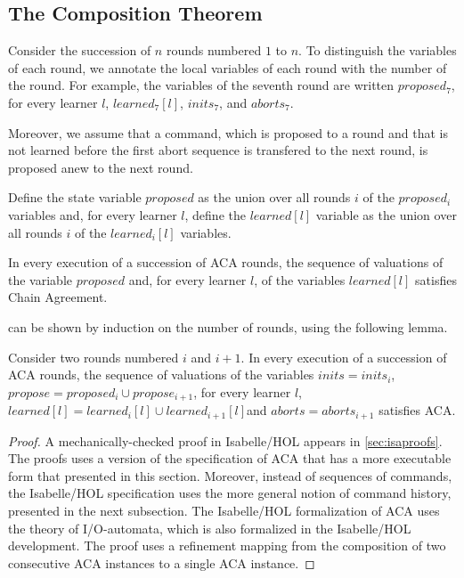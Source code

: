 \subsection{The Composition Theorem}

Consider the succession of $n$ rounds numbered $1$ to $n$.  To
distinguish the variables of each round, we annotate the local
variables of each round with the number of the round. For example, the
variables of the seventh round are written $proposed_7$, for every
learner $l$, $learned_7\left[ l \right]$, $inits_7$, and $aborts_7$.

Moreover, we assume that a command, which is proposed to a round and that
is not learned before the first abort sequence is transfered to the
next round, is proposed anew to the next round.

Define the state variable $proposed$ as the union over all rounds $i$
of the $proposed_i$ variables and, for every learner $l$, 
define the $learned\left[ l \right]$ variable as the union over all
rounds $i$ of the $learned_i\left[ l \right]$ variables.

\begin{thm}
    \label{thm:comp}
    In every execution of a succession of ACA rounds, the sequence of valuations
    of the variable $proposed$ and, for every learner $l$, of the variables
    $learned\left[ l \right]$ satisfies Chain Agreement.
\end{thm}
 can be shown by induction on the number of rounds,
using the following lemma.
\begin{lem}
  \label{lem:comp}
    Consider two rounds numbered $i$ and $i+1$. In every execution of a
    succession of ACA rounds, the sequence of valuations of the variables $inits
    = inits_i$, $propose = proposed_i \cup propose_{i+1}$, for every learner
    $l$, $learned\left[ l \right] = learned_i\left[ l \right] \cup
    learned_{i+1}\left[ l \right]$and $aborts = aborts_{i+1}$ satisfies ACA.
\end{lem}
\begin{proof}
  A mechanically-checked proof in Isabelle/HOL appears in \cref{sec:isaproofs}.
  The proofs uses a version of the specification of ACA that has a more
  executable form that presented in this section. Moreover,
  instead of sequences of commands, the Isabelle/HOL specification uses the more
  general notion of command history, presented in the next subsection.
  The Isabelle/HOL formalization of ACA uses the theory of I/O-automata, which
  is also formalized in the Isabelle/HOL development. The proof uses a refinement
  mapping from the composition of two consecutive ACA instances to a single ACA
  instance.
\end{proof}


